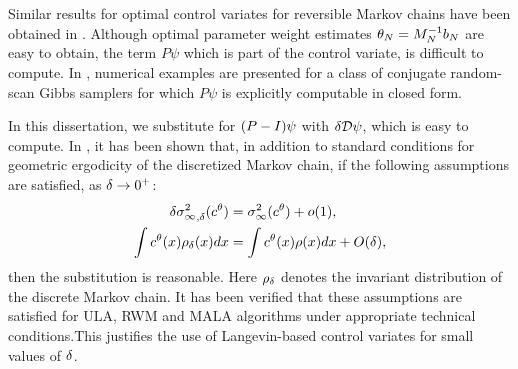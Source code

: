 Similar results for optimal control variates for reversible Markov chains have been obtained in \cite{delkon12}. Although optimal parameter weight estimates $\theta_N = M_N^{-1} b_N$ are easy to obtain, the term $P\psi$ which is part of the control variate, is difficult to compute. In \cite{delkon12}, numerical examples are presented for a class of conjugate random-scan Gibbs samplers for which $P\psi$ is explicitly computable in closed form. 

In this dissertation, we substitute for $(P-I)\psi$ with $\delta {\cal D} \psi$, which is easy to compute. In \cite{brodurmeymourad18}, it has been shown that, in addition to standard conditions for geometric ergodicity of the discretized Markov chain, if the following assumptions are satisfied, as $\delta \to 0^+$:
\begin{align}
\delta {\sigma^2_\infty}_{,\delta} (c^\theta) &= \sigma^2_\infty(c^\theta) + o(1), \\ 
\int c^\theta(x) \rho_\delta(x) dx & = \int c^\theta(x) \rho(x) dx + O(\delta), 
\end{align}
then the substitution is reasonable. Here $\rho_\delta$ denotes the invariant distribution of the discrete Markov chain. It has been verified that these assumptions are satisfied for ULA, RWM and MALA algorithms under appropriate technical conditions.This justifies the use of Langevin-based control variates for small values of $\delta$. 


